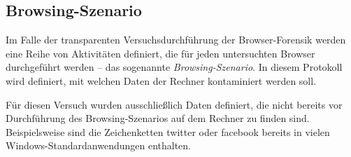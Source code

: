 \subsection{Browsing-Szenario}
\label{subsection:methodik-vorbereitung-browsing-szenario}
Im Falle der transparenten Versuchsdurchführung der Browser-Forensik werden eine Reihe von Aktivitäten definiert, die für jeden untersuchten Browser durchgeführt werden -- das sogenannte \textit{Browsing-Szenario}.
In diesem Protokoll wird definiert, mit welchen Daten der Rechner kontaminiert werden soll.

Für diesen Versuch wurden ausschließlich Daten definiert, die nicht bereits vor Durchführung des Browsing-Szenarios auf dem Rechner zu finden sind. Beispielsweise sind die Zeichenketten \glqq{}twitter\grqq{} oder \glqq{}facebook\grqq{} bereits in vielen Windows-Standardanwendungen enthalten.

